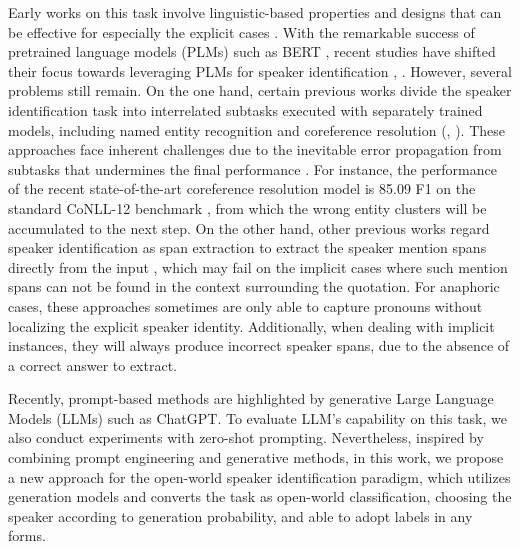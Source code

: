 \documentclass[letterpaper]{article} %
\begin{document}
Early works on this task involve linguistic-based properties and designs that can be effective for especially the explicit cases \citep{DBLP:conf/aaai/ElsonM10}.
With the remarkable success of pretrained language models (PLMs) such as BERT \citep{DBLP:conf/naacl/DevlinCLT19}, recent studies have shifted their focus towards leveraging PLMs for speaker identification \cite{DBLP:journals/corr/abs-1907-11692}, \citep{DBLP:conf/icassp/PanWYWXM21}.
However, several problems still remain. On the one hand, certain previous works divide the speaker identification task into interrelated subtasks executed with separately trained models, including named entity recognition and coreference resolution (\citep{DBLP:conf/icassp/PanWYWXM21}, \citet{yoder-etal-2021-fanfictionnlp}).
These approaches face inherent challenges due to the inevitable error propagation from subtasks that undermines the final performance \citep{DBLP:conf/naacl/YuZY22}. For instance, the performance of the recent state-of-the-art
coreference resolution model is 85.09 F1 \citep{miculicich-henderson-2022-graph} on the standard CoNLL-12 benchmark \citep{pradhan-etal-2012-conll}, from which the wrong entity clusters will be accumulated to the next step. On the other hand, other previous works regard speaker identification as span extraction to extract the speaker mention spans directly from the input \citep{DBLP:conf/naacl/YuZY22}, which may fail on the implicit cases where such mention spans can not be found in the context surrounding the quotation.
For anaphoric cases, these approaches sometimes are only able to capture pronouns without localizing the explicit speaker identity. Additionally, when dealing with implicit instances, they will always produce incorrect speaker spans, due to the absence of a correct answer to extract.

Recently, prompt-based methods are highlighted by generative Large Language Models (LLMs) such as ChatGPT. To evaluate LLM's capability on this task, we also conduct experiments with zero-shot prompting. Nevertheless, inspired by combining prompt engineering and generative methods, in this work, we propose a new approach for the open-world speaker identification paradigm, which utilizes generation models and converts the task as open-world classification, choosing the speaker according to generation probability, and able to adopt labels in any forms.
\end{document}
